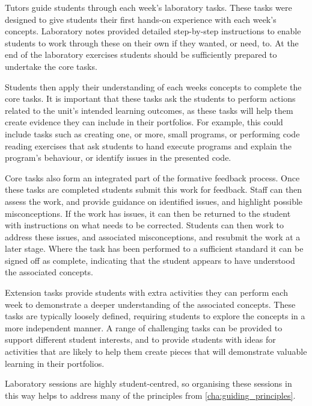 Tutors guide students through each week's laboratory tasks. These tasks were designed to give students their first hands-on experience with each week's concepts. Laboratory notes provided detailed step-by-step instructions to enable students to work through these on their own if they wanted, or need, to. At the end of the laboratory exercises students should be sufficiently prepared to undertake the core tasks.

Students then apply their understanding of each weeks concepts to complete the core tasks. It is important that these tasks ask the students to perform actions related to the unit's intended learning outcomes, as these tasks will help them create evidence they can include in their portfolios. For example, this could include tasks such as creating one, or more, small programs, or performing code reading exercises that ask students to hand execute programs and explain the program's behaviour, or identify issues in the presented code. 

Core tasks also form an integrated part of the formative feedback process. Once these tasks are completed students submit this work for feedback. Staff can then assess the work, and provide guidance on identified issues, and highlight possible misconceptions. If the work has issues, it can then be returned to the student with instructions on what needs to be corrected. Students can then work to address these issues, and associated misconceptions, and resubmit the work at a later stage. Where the task has been performed to a sufficient standard it can be signed off as complete, indicating that the student appears to have understood the associated concepts.

Extension tasks provide students with extra activities they can perform each week to demonstrate a deeper understanding of the associated concepts. These tasks are typically loosely defined, requiring students to explore the concepts in a more independent manner. A range of challenging tasks can be provided to support different student interests, and to provide students with ideas for activities that are likely to help them create pieces that will demonstrate valuable learning in their portfolios.

Laboratory sessions are highly student-centred, so organising these sessions in this way helps to address many of the principles from \cref{cha:guiding_principles}.  

